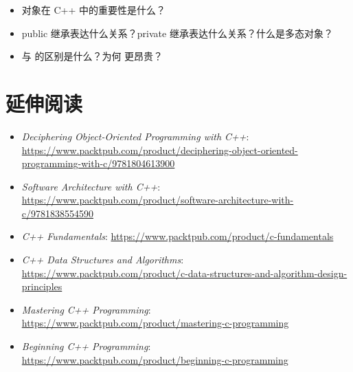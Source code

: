 \begin{itemize}
\item 对象在 C++ 中的重要性是什么？
\item public 继承表达什么关系？private 继承表达什么关系？什么是多态对象？
\item {}与  的区别是什么？为何 更昂贵？
\end{itemize}

\section{延伸阅读}

\begin{itemize}
\item \emph{Deciphering Object-Oriented Programming with C++}: \url{https://www.packtpub.com/product/deciphering-object-oriented-programming-with-c/9781804613900}
\item \emph{Software Architecture with C++}: \url{https://www.packtpub.com/product/software-architecture-with-c/9781838554590}
\item \emph{C++ Fundamentals}: \url{https://www.packtpub.com/product/c-fundamentals}
\item \emph{C++ Data Structures and Algorithms}:\url{ https://www.packtpub.com/product/c-data-structures-and-algorithm-design-principles}
\item \emph{Mastering C++ Programming}: \url{https://www.packtpub.com/product/mastering-c-programming}
\item \emph{Beginning C++ Programming}: \url{https://www.packtpub.com/product/beginning-c-programming}
\end{itemize}
%

